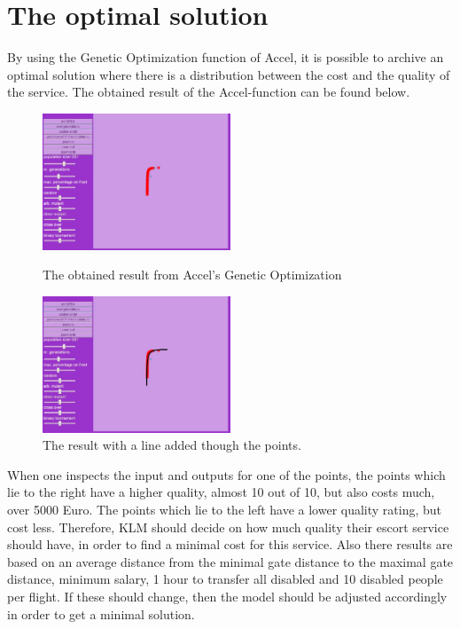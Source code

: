 \documentclass[a4paper, 11pt, notitlepage]{report}
\begin{document}
\section{The optimal solution}
By using the Genetic Optimization function of Accel, it is possible to archive an optimal solution where there is a distribution between the cost and the quality of the service. The obtained result of the Accel-function can be found below.
\begin{figure}
  \begin{center}
  \includegraphics[width=0.5\textwidth]{figures/optimized}
  \caption{The obtained result from Accel's Genetic Optimization}
    \includegraphics[width=0.5\textwidth]{figures/optimized2}
      \caption{The result with a line added though the points.}
  \end{center}
\end{figure}
When one inspects the input and outputs for one of the points, the points which lie  to the right have a higher quality, almost 10 out of 10, but also costs much, over 5000 Euro. The points which lie to the left have a lower quality rating, but cost less. Therefore, KLM should decide on how much quality their escort service should have, in order to find a minimal cost for this service. Also there results are based on an average distance from the minimal gate distance to the maximal gate distance, minimum salary, 1 hour to transfer all disabled and 10 disabled people per flight. If these should change, then the model should be adjusted accordingly in order to get a minimal solution.
\end{document}
